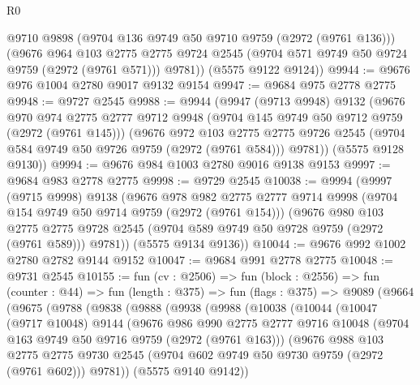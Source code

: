 \begin{lexlean}{R0}
\begin{coremodule}
        @9710
        @9898
        (@9704 @136 @9749 @50 @9710 @9759 (@2972 (@9761 @136)))
        (@9676
          @964
          @103
          @2775
          @2775
          @9724
          @2545
          (@9704 @571 @9749 @50 @9724 @9759 (@2972 (@9761 @571)))
          @9781))
      (@5575 @9122 @9124))
@9944 := @9676 @976 @1004 @2780 @9017 @9132 @9154
@9947 := @9684 @975 @2778 @2775
@9948 := @9727 @2545
@9988 := @9944
    (@9947
      (@9713 @9948)
      @9132
      (@9676
        @970
        @974
        @2775
        @2777
        @9712
        @9948
        (@9704 @145 @9749 @50 @9712 @9759 (@2972 (@9761 @145)))
        (@9676
          @972
          @103
          @2775
          @2775
          @9726
          @2545
          (@9704 @584 @9749 @50 @9726 @9759 (@2972 (@9761 @584)))
          @9781))
      (@5575 @9128 @9130))
@9994 := @9676 @984 @1003 @2780 @9016 @9138 @9153
@9997 := @9684 @983 @2778 @2775
@9998 := @9729 @2545
@10038 := @9994
    (@9997
      (@9715 @9998)
      @9138
      (@9676
        @978
        @982
        @2775
        @2777
        @9714
        @9998
        (@9704 @154 @9749 @50 @9714 @9759 (@2972 (@9761 @154)))
        (@9676
          @980
          @103
          @2775
          @2775
          @9728
          @2545
          (@9704 @589 @9749 @50 @9728 @9759 (@2972 (@9761 @589)))
          @9781))
      (@5575 @9134 @9136))
@10044 := @9676 @992 @1002 @2780 @2782 @9144 @9152
@10047 := @9684 @991 @2778 @2775
@10048 := @9731 @2545
@10155 := fun (cv : @2506) =>
  fun (block : @2556) =>
  fun (counter : @44) =>
  fun (length : @375) =>
  fun (flags : @375) =>
  @9089
    (@9664
      (@9675
        (@9788
          (@9838
            (@9888
              (@9938
                (@9988
                  (@10038
                    (@10044
                      (@10047
                        (@9717 @10048)
                        @9144
                        (@9676
                          @986
                          @990
                          @2775
                          @2777
                          @9716
                          @10048
                          (@9704 @163 @9749 @50 @9716 @9759 (@2972 (@9761 @163)))
                          (@9676
                            @988
                            @103
                            @2775
                            @2775
                            @9730
                            @2545
                            (@9704 @602 @9749 @50 @9730 @9759 (@2972 (@9761 @602)))
                            @9781))
                        (@5575 @9140 @9142))

\end{coremodule}
\end{lexlean}
